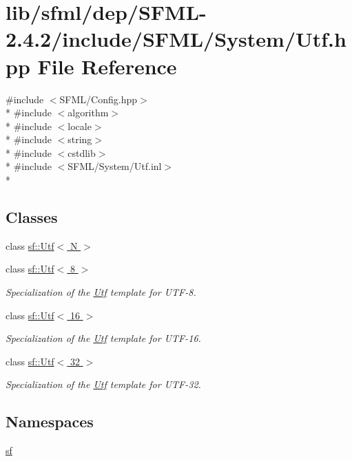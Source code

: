 \hypertarget{sfml_2dep_2_s_f_m_l-2_84_82_2include_2_s_f_m_l_2_system_2_utf_8hpp}{\section{lib/sfml/dep/\-S\-F\-M\-L-\/2.4.2/include/\-S\-F\-M\-L/\-System/\-Utf.hpp File Reference}
\label{sfml_2dep_2_s_f_m_l-2_84_82_2include_2_s_f_m_l_2_system_2_utf_8hpp}
}
{\ttfamily \#include $<$S\-F\-M\-L/\-Config.\-hpp$>$}\\*
{\ttfamily \#include $<$algorithm$>$}\\*
{\ttfamily \#include $<$locale$>$}\\*
{\ttfamily \#include $<$string$>$}\\*
{\ttfamily \#include $<$cstdlib$>$}\\*
{\ttfamily \#include $<$S\-F\-M\-L/\-System/\-Utf.\-inl$>$}\\*
\subsection*{Classes}
\begin{DoxyCompactItemize}
\item 
class \hyperlink{classsf_1_1_utf}{sf\-::\-Utf$<$ N $>$}
\item 
class \hyperlink{classsf_1_1_utf_3_018_01_4}{sf\-::\-Utf$<$ 8 $>$}
\begin{DoxyCompactList}\small\item\em Specialization of the \hyperlink{classsf_1_1_utf}{Utf} template for U\-T\-F-\/8. \end{DoxyCompactList}\item 
class \hyperlink{classsf_1_1_utf_3_0116_01_4}{sf\-::\-Utf$<$ 16 $>$}
\begin{DoxyCompactList}\small\item\em Specialization of the \hyperlink{classsf_1_1_utf}{Utf} template for U\-T\-F-\/16. \end{DoxyCompactList}\item 
class \hyperlink{classsf_1_1_utf_3_0132_01_4}{sf\-::\-Utf$<$ 32 $>$}
\begin{DoxyCompactList}\small\item\em Specialization of the \hyperlink{classsf_1_1_utf}{Utf} template for U\-T\-F-\/32. \end{DoxyCompactList}\end{DoxyCompactItemize}
\subsection*{Namespaces}
\begin{DoxyCompactItemize}
\item 
\hyperlink{namespacesf}{sf}
\end{DoxyCompactItemize}
